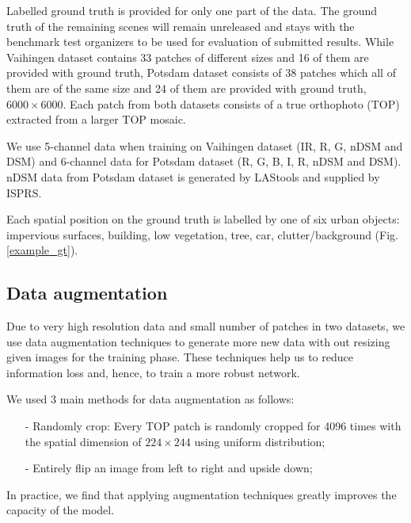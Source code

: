 \documentclass[conference]{IEEEtran}
\begin{document}
Labelled ground truth is provided for only one part of the data. The ground
truth of the remaining scenes will remain unreleased and stays with the
benchmark test organizers to be used for evaluation of submitted results.
While Vaihingen dataset contains 33 patches of different sizes and 16 of them
are provided with ground truth, Potsdam dataset consists of 38 patches which all
of them are of the same size and 24 of them are provided with ground truth,
$6000 \times 6000$. Each patch from both datasets consists of a true orthophoto
(TOP) extracted from a larger TOP mosaic.

We use 5-channel data when training on Vaihingen dataset (IR, R, G, nDSM and
DSM) and 6-channel data for Potsdam dataset (R, G, B, I, R, nDSM and DSM).
nDSM data from Potsdam dataset is generated by LAStools and supplied by ISPRS.

Each spatial position on the ground truth is labelled by one of six urban
objects: impervious surfaces, building, low vegetation, tree, car,
clutter/background (Fig.\ref{example_gt}).

\subsection{Data augmentation}
Due to very high resolution data and small number of patches in two datasets, we
use data augmentation techniques to generate more new data with out resizing
given images for the training phase. These techniques help us to reduce
information loss and, hence, to train a more robust network.

We used 3 main methods for data augmentation as follows: 
\begin{itemize}
\item[-] Randomly crop: Every TOP patch is randomly cropped for 4096 times with
the spatial dimension of $224 \times 244$ using uniform distribution;
\item[-] Entirely flip an image from left to right and upside down;
\end{itemize}
In practice, we find that applying augmentation techniques greatly improves the capacity of the model.

\end{document}
